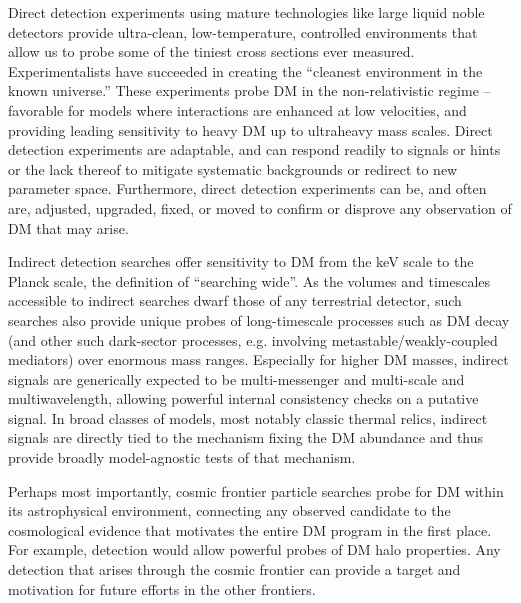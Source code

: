 \documentclass[nofootinbib]{article}
\begin{document}
\vspace{1em}

 Direct detection experiments using mature technologies like large liquid noble detectors provide ultra-clean, low-temperature, controlled environments that allow us to probe some of the tiniest cross sections ever measured. Experimentalists have succeeded in creating the ``cleanest environment in the known universe.'' These experiments probe DM in the non-relativistic regime -- favorable for models where interactions are enhanced at low velocities, and providing leading sensitivity to heavy DM up to ultraheavy mass scales. Direct detection experiments are adaptable, and can respond readily to signals or hints or the lack thereof to mitigate systematic backgrounds or redirect to new parameter space. Furthermore, direct detection experiments can be, and often are, adjusted, upgraded, fixed, or moved to confirm or disprove any observation of DM that may arise.

Indirect detection searches offer sensitivity to DM from the keV scale to the Planck scale, the definition of ``searching wide''. As the volumes and timescales accessible to indirect searches dwarf those of any terrestrial detector, such searches also provide unique probes of long-timescale processes such as DM decay (and other such dark-sector processes, e.g. involving metastable/weakly-coupled mediators) over enormous mass ranges. Especially for higher DM masses, indirect signals are generically expected to be multi-messenger and multi-scale and multiwavelength, allowing powerful internal consistency checks on a putative signal. In broad classes of models, most notably classic thermal relics, indirect signals are directly tied to the mechanism fixing the DM abundance and thus provide broadly model-agnostic tests of that mechanism.  %

Perhaps most importantly, cosmic frontier particle searches probe for DM within its astrophysical environment, connecting any observed candidate to the cosmological evidence that motivates the entire DM program in the first place. For example, detection would allow powerful probes of DM halo properties. Any detection that arises through the cosmic frontier can provide a target and motivation for future efforts in the other frontiers.  
\end{document}
